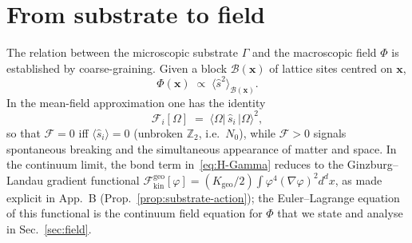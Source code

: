 \documentclass[11pt,a4paper]{article}
\renewcommand{\Phi}{\varPhi}
\newcommand{\Nzero}{N_{0}}
\newcommand{\Ffield}{\mathcal{F}}
\newcommand{\Zp}{\mathbb{Z}_{2}}
\begin{document}
\section{From substrate to field}\label{sec:substrate-to-field}

The relation between the microscopic substrate $\Gamma$ and the macroscopic
field $\Phi$ is established by coarse-graining. Given a block
$\mathcal{B}(\mathbf{x})$ of lattice sites centred on $\mathbf{x}$,
\begin{equation}\label{eq:Phi-def}
  \Phi(\mathbf{x})
  \;\propto\;
  \langle\hat{s}^{2}\rangle_{\mathcal{B}(\mathbf{x})}.
\end{equation}
In the mean-field approximation one has the identity
\begin{equation}\label{eq:F-s-relation}
  \Ffield_{i}[\Omega]
  \;=\;\langle\Omega|\,\hat{s}_{i}\,|\Omega\rangle^{2},
\end{equation}
so that $\Ffield=0$ iff $\langle\hat{s}_{i}\rangle=0$ (unbroken $\Zp$,
i.e.\ $\Nzero$), while $\Ffield>0$ signals spontaneous breaking and the
simultaneous appearance of matter and space. In the continuum limit,
the bond term in~\eqref{eq:H-Gamma} reduces to the Ginzburg--Landau
gradient functional $\mathcal{F}_{\mathrm{kin}}^{\mathrm{geo}}[\varphi]
=(K_{\mathrm{geo}}/2)\int\varphi^{4}(\nabla\varphi)^{2}d^{d}x$, as made
explicit in App.~B (Prop.~\ref{prop:substrate-action}); the Euler--Lagrange
equation of this functional is the continuum field equation for $\Phi$
that we state and analyse in Sec.~\ref{sec:field}.
\end{document}
